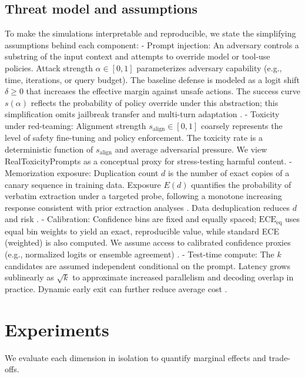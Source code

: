 \documentclass[10pt]{article}
\begin{document}
\subsection{Threat model and assumptions}
To make the simulations interpretable and reproducible, we state the simplifying assumptions behind each component:
- Prompt injection: An adversary controls a substring of the input context and attempts to override model or tool-use policies. Attack strength $\alpha\in[0,1]$ parameterizes adversary capability (e.g., time, iterations, or query budget). The baseline defense is modeled as a logit shift $\delta\ge 0$ that increases the effective margin against unsafe actions. The success curve $s(\alpha)$ reflects the probability of policy override under this abstraction; this simplification omits jailbreak transfer and multi-turn adaptation \citep{Greshake2023IndirectPromptInjection, Zou2023UniversalJailbreaks}.
- Toxicity under red-teaming: Alignment strength $s_{\text{align}}\in[0,1]$ coarsely represents the level of safety fine-tuning and policy enforcement. The toxicity rate is a deterministic function of $s_{\text{align}}$ and average adversarial pressure. We view RealToxicityPrompts \citep{Gehman2020RealToxicity} as a conceptual proxy for stress-testing harmful content.
- Memorization exposure: Duplication count $d$ is the number of exact copies of a canary sequence in training data. Exposure $E(d)$ quantifies the probability of verbatim extraction under a targeted probe, following a monotone increasing response consistent with prior extraction analyses \citep{Carlini2021ExtractingTrainingData}. Data deduplication reduces $d$ and risk \citep{Lee2022Dedup}.
- Calibration: Confidence bins are fixed and equally spaced; $\mathrm{ECE}_{\mathrm{eq}}$ uses equal bin weights to yield an exact, reproducible value, while standard ECE (weighted) is also computed. We assume access to calibrated confidence proxies (e.g., normalized logits or ensemble agreement) \citep{Desai2020Calibration}.
- Test-time compute: The $k$ candidates are assumed independent conditional on the prompt. Latency grows sublinearly as $\sqrt{k}$ to approximate increased parallelism and decoding overlap in practice. Dynamic early exit can further reduce average cost \citep{Xin2020DeeBERT}.

\section{Experiments}
We evaluate each dimension in isolation to quantify marginal effects and trade-offs.
\end{document}
